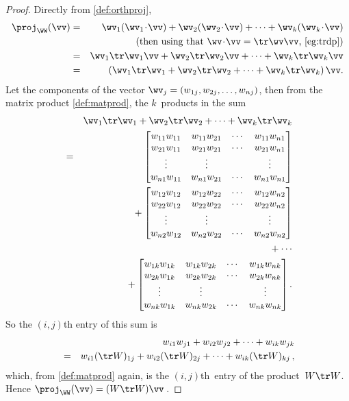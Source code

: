 \begin{proof} 
Directly from \autoref{def:orthproj},
\begin{eqnarray*}
\proj_\WW(\vv)&=&\wv_1(\wv_1\cdot\vv)+\wv_2(\wv_2\cdot\vv)+\cdots+\wv_k(\wv_k\cdot\vv)
\\&&(\text{then using that \(\wv\cdot\vv=\tr\wv\vv\), \autoref{eg:trdp}})
\\&=&\wv_1\tr\wv_1\vv+\wv_2\tr\wv_2\vv+\cdots+\wv_k\tr\wv_k\vv
\\&=&\left(\wv_1\tr\wv_1+\wv_2\tr\wv_2+\cdots+\wv_k\tr\wv_k\right)\vv.
\end{eqnarray*}
Let the components of the vector \(\wv_j=(w_{1j},w_{2j},\ldots,w_{nj})\), then from the matrix product \autoref{def:matprod}, the \(k\)~products in the sum 
\def\ww#1{\begin{bmatrix} 
w_{1#1}w_{1#1}& w_{1#1}w_{2#1}&\cdots& w_{1#1}w_{n#1} \\
w_{2#1}w_{1#1}& w_{2#1}w_{2#1}&\cdots& w_{2#1}w_{n#1} \\
\vdots&\vdots&&\vdots\\
w_{n#1}w_{1#1}& w_{n#1}w_{2#1}&\cdots& w_{n#1}w_{n#1} 
\end{bmatrix}}
\begin{eqnarray*}
&&\wv_1\tr\wv_1+\wv_2\tr\wv_2+\cdots+\wv_k\tr\wv_k
\\&=& \ww1
\\&&{}+\ww2
\\&&{}+\cdots
\\&&{}+\ww k.
\end{eqnarray*}
So the \((i,j)\)th entry of this sum is
\begin{eqnarray*}
&&w_{i1}w_{j1}+w_{i2}w_{j2}+\cdots+w_{ik}w_{jk}
\\&=&w_{i1}(\tr W)_{1j}+w_{i2}(\tr W)_{2j}+\cdots+w_{ik}(\tr W)_{kj} \,,
\end{eqnarray*}
which, from \autoref{def:matprod} again, is the \((i,j)\)th~entry of the product~\(W\tr W\).
Hence \(\proj_\WW(\vv)=(W\tr W)\vv\)\,.
\end{proof}




